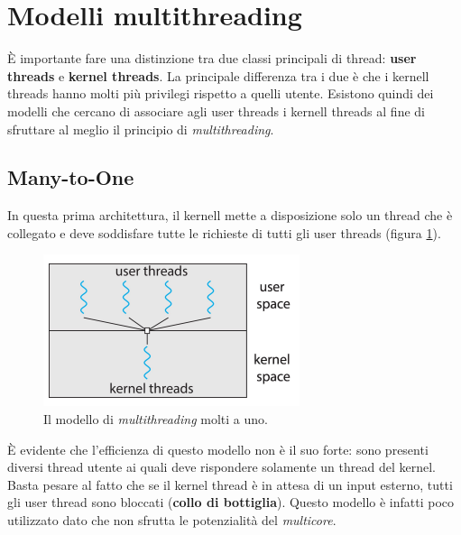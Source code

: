 \section{Modelli multithreading}
È importante fare una distinzione tra due classi principali di thread: \textbf{user threads} e \textbf{kernel threads}. La principale differenza tra i due è che i kernell threads hanno molti più privilegi rispetto a quelli utente. Esistono quindi dei modelli che cercano di associare agli user threads i kernell threads al fine di sfruttare al meglio il principio di \textit{multithreading}.

\subsection{Many-to-One}
In questa prima architettura, il kernell mette a disposizione solo un thread che è collegato e deve soddisfare tutte le richieste di tutti gli user threads (figura \ref{fig:many_to_one}).
\begin{figure}[!h]
    \centering
    \includegraphics[width = .5\textwidth]{../res/imgs/threads/many_to_one.png}
    \caption{Il modello di \textit{multithreading} molti a uno.}
    \label{fig:many_to_one}
\end{figure}
È evidente che l'efficienza di questo modello non è il suo forte: sono presenti diversi thread utente ai quali deve rispondere solamente un thread del kernel. Basta pesare al fatto che se il kernel thread è in attesa di un input esterno, tutti gli user thread sono bloccati (\textbf{collo di bottiglia}). Questo modello è infatti poco utilizzato dato che non sfrutta le potenzialità del \textit{multicore}. 
% 
